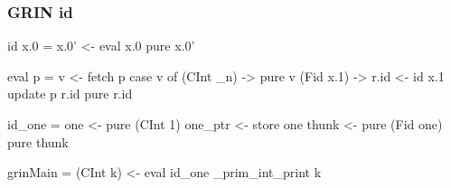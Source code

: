 \documentclass[bigger]{beamer}
\begin{document}
\begin{frame}[fragile]
\frametitle{GRIN id}

\begin{center}

	\begin{minipage}{0.40\textwidth}
		\begin{haskellcode}
			id x.0 =
			 x.0' <- eval x.0
			 pure x.0'
		\end{haskellcode}
		\vfill
		\pause
		\begin{haskellcode}
			eval p =
			 v <- fetch p
			 case v of
			  (CInt _n) -> pure v
			  (Fid x.1) ->
			   r.id <- id x.1
			   update p r.id
			   pure r.id
		\end{haskellcode}
	\end{minipage}
	\hfill
	\pause
	\begin{minipage}{0.50\textwidth}
		\begin{haskellcode}
			id_one =
			 one     <- pure (CInt 1)
			 one_ptr <- store one
			 thunk   <- pure (Fid one)
			 pure thunk
		\end{haskellcode}
		\vspace{1.55cm}
		\pause
		\begin{haskellcode}
			grinMain =
			 (CInt k) <- eval id_one
			 _prim_int_print k
		\end{haskellcode}
	\end{minipage}

\end{center}
\end{frame}
\end{document}
